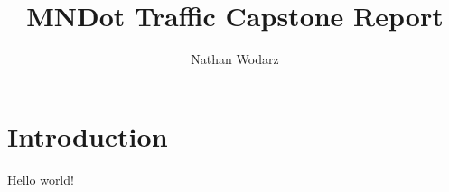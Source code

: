 \documentclass[9pt,twocolumn,twoside, lineno]{jost-new}
\title{MNDot Traffic Capstone Report}
\author{Nathan Wodarz}
\numberwithin{subsection}{section}
\begin{document}
\maketitle
\thispagestyle{firststyle}
\begin{nolinenumbers}
\tableofcontents
\end{nolinenumbers}
\pagebreak

\section{Introduction}
Hello world!
\end{document}
